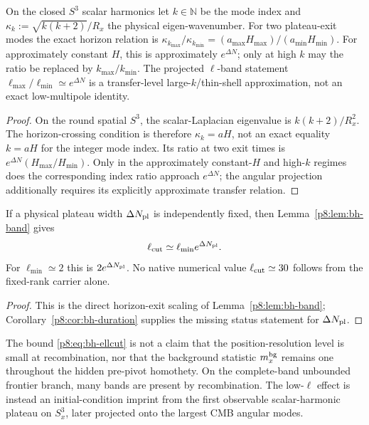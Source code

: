 \documentclass[12pt,a4paper]{article}
\begin{document}
\begin{lemma}
\label{p8:lem:bh-band}
On the closed $S^3$ scalar harmonics let $k\in\mathbb N$ be the
mode index and $\kappa_k:=\sqrt{k(k+2)}/R_x$ the physical eigen-wavenumber.
For two plateau-exit modes the exact horizon relation is
$\kappa_{k_{\max}}/\kappa_{k_{\min}}
=(a_{\max}H_{\max})/(a_{\min}H_{\min})$.
For approximately constant $H$, this is approximately $e^{\Delta N}$;
only at high $k$ may the ratio be replaced by $k_{\max}/k_{\min}$.
The projected $\ell$-band statement
$\ell_{\max}/\ell_{\min}\simeq e^{\Delta N}$ is a transfer-level
large-$k$/thin-shell approximation, not an exact low-multipole identity.
\end{lemma}
\begin{proof}
On the round spatial $S^3$, the scalar-Laplacian eigenvalue is
$k(k+2)/R_x^2$. The horizon-crossing condition is therefore
$\kappa_k=aH$, not an exact equality $k=aH$ for the integer mode index.
Its ratio at two exit times is $e^{\Delta N}(H_{\max}/H_{\min})$.
Only in the approximately constant-$H$ and high-$k$ regimes does the
corresponding index ratio approach $e^{\Delta N}$; the angular projection
additionally requires its explicitly approximate transfer relation.
\end{proof}

\begin{corollary}
\label{p8:cor:bh-ellcut}
If a physical plateau width \(\Delta N_{\rm pl}\) is independently fixed,
then Lemma~\ref{p8:lem:bh-band} gives
\begin{equation}
\label{p8:eq:bh-ellcut}
 \ell_{\rm cut}\simeq \ell_{\min}e^{\Delta N_{\rm pl}}.
\end{equation}
For \(\ell_{\min}\simeq2\) this is \(2e^{\Delta N_{\rm pl}}\).  No native
numerical value \(\ell_{\rm cut}\simeq30\) follows from the fixed-rank carrier
alone.
\end{corollary}

\begin{proof}
This is the direct horizon-exit scaling of
Lemma~\ref{p8:lem:bh-band}; Corollary~\ref{p8:cor:bh-duration} supplies the
missing status statement for \(\Delta N_{\rm pl}\).
\end{proof}

\begin{remark}
The bound \eqref{p8:eq:bh-ellcut} is not a claim that the position-resolution
level is small at recombination, nor that the background statistic
\(m_x^{\rm bg}\) remains one throughout the hidden pre-pivot homothety.  On
the complete-band unbounded frontier branch, many bands are present by
recombination.  The low-\(\ell\) effect is instead an initial-condition imprint
from the first observable scalar-harmonic plateau on \(S^3_x\), later
projected onto the largest CMB angular modes.
\end{remark}
\end{document}
